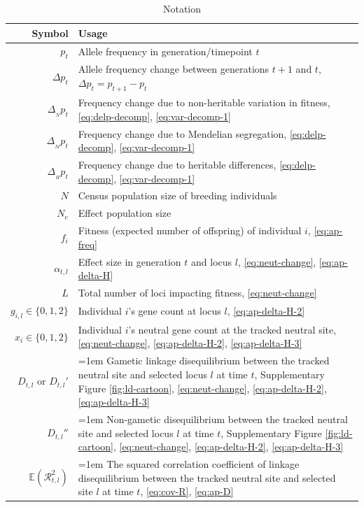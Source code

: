 \documentclass[11pt]{article}
\newcommand{\E}{\mathbb{E}}
\begin{document}
\begin{table}[!htbp]
  \caption{Notation}
  \begin{tabular}{r|p{12cm}}
 Symbol & Usage  \\ \hline
 $p_t$ & Allele frequency in generation/timepoint $t$  \\
 $\Delta p_t$ & Allele frequency change between generations $t+1$ and $t$, $\Delta p_t = p_{t+1} - p_t$ \\
 $\Delta_{_N} p_t $ & Frequency change due to non-heritable variation in fitness, \eqref{eq:delp-decomp}, \eqref{eq:var-decomp-1}  \\
 $\Delta_{_M} p_t $ & Frequency change due to Mendelian segregation, \eqref{eq:delp-decomp}, \eqref{eq:var-decomp-1} \\
 $\Delta_{_H} p_t $ & Frequency change due to heritable differences, \eqref{eq:delp-decomp}, \eqref{eq:var-decomp-1} \\
 $N$ & Census population size of breeding individuals \\
 $N_e$ & Effect population size \\
 $f_i$ & Fitness (expected number of offspring) of individual $i$, \eqref{eq:ap-freq}\\
 $\alpha_{t,l}$ & Effect size in generation $t$ and locus $l$, \eqref{eq:neut-change}, \eqref{eq:ap-delta-H} \\
 $L$ & Total number of loci impacting fitness, \eqref{eq:neut-change} \\
 $g_{i,l} \in \{0, 1, 2\}$ & Individual $i$'s gene count at locus $l$, \eqref{eq:ap-delta-H-2} \\
 $x_{i} \in \{0, 1, 2\}$ & Individual $i$'s neutral gene count at the tracked neutral site, \eqref{eq:neut-change}, \eqref{eq:ap-delta-H-2}, \eqref{eq:ap-delta-H-3} \\
 $D_{t,l}$ or $D_{t,l}'$ & \hangindent=1em Gametic linkage disequilibrium between the tracked neutral site and selected locus $l$ at time $t$, Supplementary Figure \ref{fig:ld-cartoon}, \eqref{eq:neut-change}, \eqref{eq:ap-delta-H-2}, \eqref{eq:ap-delta-H-3} \\
 $D_{t,l}''$ & \hangindent=1em Non-gametic disequilibrium between the tracked neutral site and selected locus $l$ at time $t$, Supplementary Figure \ref{fig:ld-cartoon}, \eqref{eq:neut-change}, \eqref{eq:ap-delta-H-2}, \eqref{eq:ap-delta-H-3} \\
 $\E(\mathcal{R}_{t,l}^2)$ & \hangindent=1em The squared correlation coefficient of linkage disequilibrium between the tracked neutral site and selected site $l$ at time $t$, \eqref{eq:cov-R}, \eqref{eq:ap-D}\\

\end{tabular}
\end{table}
\end{document}
